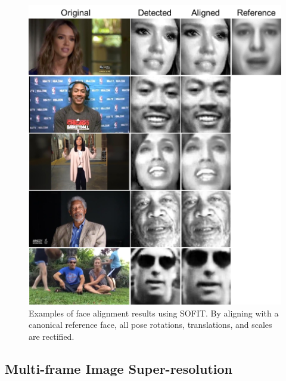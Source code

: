 \documentclass[10pt,journal]{IEEEtran}
\begin{document}
\begin{figure}[htbp]
	\centering
		\includegraphics[width=.8\columnwidth]{fig/suppliment.png}
	\caption{Examples of face alignment results using SOFIT. By aligning with a canonical reference face, all pose rotations, translations, and scales are rectified. }
	\label{fig:suppliment}
\end{figure}



\subsection{Multi-frame Image Super-resolution}
\end{document}
